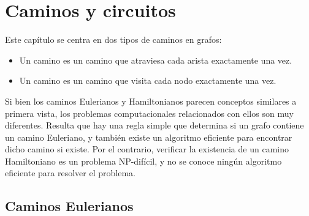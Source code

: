 \chapter{Caminos y circuitos}

Este capítulo se centra en dos tipos de caminos en grafos:
\begin{itemize}
\item Un camino  es un camino que
atraviesa cada arista exactamente una vez.
\item Un camino  es un camino
que visita cada nodo exactamente una vez.
\end{itemize}

Si bien los caminos Eulerianos y Hamiltonianos parecen
conceptos similares a primera vista,
los problemas computacionales relacionados con ellos
son muy diferentes.
Resulta que hay una regla simple que
determina si un grafo contiene un camino Euleriano,
y también existe un algoritmo eficiente para
encontrar dicho camino si existe.
Por el contrario, verificar la existencia de un camino Hamiltoniano es un problema NP-difícil,
y no se conoce ningún algoritmo eficiente para resolver el problema.

\section{Caminos Eulerianos}


